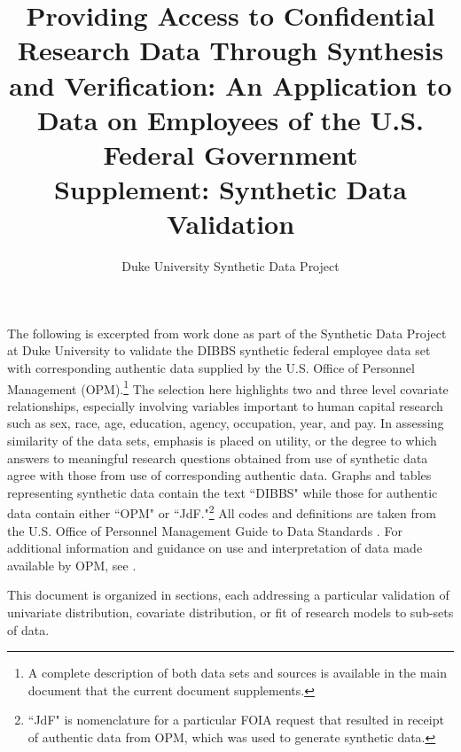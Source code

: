 \documentclass[10pt, letterpaper]{article}
\title{\LARGE Providing Access to Confidential Research Data Through Synthesis and Verification: An Application to Data on Employees of the U.S. Federal Government\\
\vspace{12pt} \Large Supplement:  Synthetic Data Validation}
\author{Duke University Synthetic Data Project}
\begin{document}
\begin{spacing}{1.0}

\maketitle

\vspace{20pt}

The following is excerpted from work done as part of the Synthetic Data Project at Duke University to validate the DIBBS synthetic federal employee data set with corresponding authentic data supplied by the U.S. Office of Personnel Management (OPM).\footnote{A complete description of both data sets and sources is available in the main document that the current document supplements.}  The selection here highlights two and three level covariate relationships, especially involving variables important to human capital research such as sex, race, age, education, agency, occupation, year, and pay.  In assessing similarity of the data sets, emphasis is placed on utility, or the degree to which answers to meaningful research questions obtained from use of synthetic data agree with those from use of corresponding authentic data.  Graphs and tables representing synthetic data contain the text ``DIBBS" while those for authentic data contain either ``OPM" or ``JdF."\footnote{``JdF" is nomenclature for a particular FOIA request that resulted in receipt of authentic data from OPM, which was used to generate synthetic data.}  All codes and definitions are taken from the U.S. Office of Personnel Management Guide to Data Standards \citep{OPMGDS}.  For additional information and guidance on use and interpretation of data made available by OPM, see \citep{OPMDataAnalysis}.\\

\clearpage

This document is organized in sections, each addressing a particular validation of univariate distribution, covariate distribution, or fit of research models to sub-sets of data.

\renewcommand\cfttoctitlefont{\large}
\renewcommand\cftsecfont{\normalsize}
\renewcommand\cftsecpagefont{\normalsize}
\renewcommand\cftsubsecfont{\normalsize}
\renewcommand\cftsubsecpagefont{\normalsize}
\renewcommand{\cftsecleader}{\cftdotfill{\cftdotsep}}
\renewcommand*\contentsname{List of Sections}
\begin{center}
    \begin{minipage}{5.5in}
        \tableofcontents
    \end{minipage}
\end{center}


\end{spacing}
\end{document}
